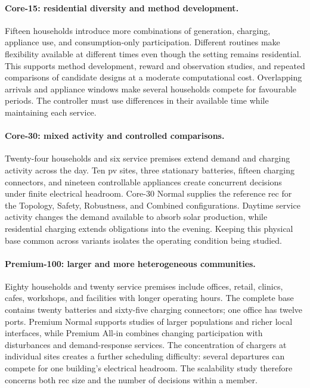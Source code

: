 \paragraph{Core-15: residential diversity and method development.}
Fifteen households introduce more combinations of generation, charging, appliance use, and consumption-only participation. Different routines make flexibility available at different times even though the setting remains residential. This supports method development, reward and observation studies, and repeated comparisons of candidate designs at a moderate computational cost. Overlapping arrivals and appliance windows make several households compete for favourable periods. The controller must use differences in their available time while maintaining each service.

\paragraph{Core-30: mixed activity and controlled comparisons.}
Twenty-four households and six service premises extend demand and charging activity across the day. Ten \gls{pv} sites, three stationary batteries, fifteen charging connectors, and nineteen controllable appliances create concurrent decisions under finite electrical headroom. Core-30 Normal supplies the reference \gls{rec} for the Topology, Safety, Robustness, and Combined configurations. Daytime service activity changes the demand available to absorb solar production, while residential charging extends obligations into the evening. Keeping this physical base common across variants isolates the operating condition being studied.

\paragraph{Premium-100: larger and more heterogeneous communities.}
Eighty households and twenty service premises include offices, retail, clinics, cafes, workshops, and facilities with longer operating hours. The complete base contains twenty batteries and sixty-five charging connectors; one office has twelve ports. Premium Normal supports studies of larger populations and richer local interfaces, while Premium All-in combines changing participation with disturbances and demand-response services. The concentration of chargers at individual sites creates a further scheduling difficulty: several departures can compete for one building's electrical headroom. The scalability study therefore concerns both \gls{rec} size and the number of decisions within a member.

